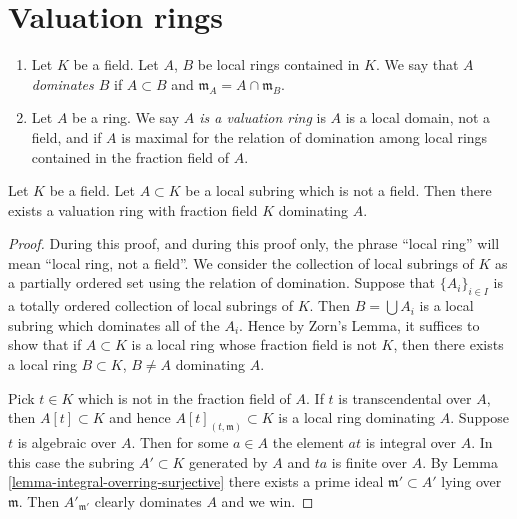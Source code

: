 \section{Valuation rings}
\label{section-valuation-rings}

\begin{definition}
\label{definition-valuation-ring}
\begin{enumerate}
\item Let $K$ be a field. Let $A$, $B$ be local rings contained
in $K$. We say that {\it $A$ dominates $B$} if $A \subset B$
and $\mathfrak m_A = A \cap \mathfrak m_B$.
\item Let $A$ be a ring. We say {\it $A$ is a valuation ring}
is $A$ is a local domain, not a field, and if $A$ is maximal
for the relation of domination among local rings contained in
the fraction field of $A$.
\end{enumerate}
\end{definition}

\begin{lemma}
\label{lemma-dominate}
Let $K$ be a field.
Let $A \subset K$ be a local subring which is not a field.
Then there exists a valuation ring with fraction field $K$
dominating $A$.
\end{lemma}

\begin{proof}
During this proof, and during this proof only, the phrase
``local ring'' will mean ``local ring, not a field''.
We consider the collection of local subrings
of $K$ as a partially ordered set using the relation of domination.
Suppose that $\{A_i\}_{i \in I}$ is a totally ordered
collection of local subrings of $K$. Then $B = \bigcup A_i$
is a local subring which dominates all of the $A_i$.
Hence by Zorn's Lemma, it suffices to show that if $A \subset K$
is a local ring whose fraction field is not $K$, then there
exists a local ring $B \subset K$, $B \not = A$ dominating $A$.

\medskip\noindent
Pick $t \in K$ which is not in the fraction field of $A$.
If $t$ is transcendental over $A$, then $A[t] \subset K$
and hence $A[t]_{(t, \mathfrak m)} \subset K$ is a local ring
dominating $A$.
Suppose $t$ is algebraic over $A$.
Then for some $a \in A$ the element $at$ is integral over $A$.
In this case the subring $A' \subset K$ generated by $A$ and
$ta$ is finite over $A$.
By Lemma \ref{lemma-integral-overring-surjective} there exists
a prime ideal $\mathfrak m' \subset A'$ lying over
$\mathfrak m$. Then $A'_{\mathfrak m'}$ clearly dominates
$A$ and we win.
\end{proof}

